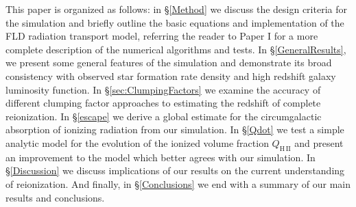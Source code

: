 This paper is organized as follows: in \S\ref{Method} we discuss the design criteria 
for the simulation and briefly outline the basic equations and implementation of the FLD radiation transport model, referring the
reader to Paper I for a more complete description of the numerical algorithms and tests.  
In \S\ref{GeneralResults},  we present some general features of the simulation and demonstrate its broad consistency with observed star formation rate density and high redshift 
galaxy luminosity function. 
In \S\ref{sec:ClumpingFactors} we examine the accuracy of different clumping factor approaches to estimating the redshift of complete reionization.
In \S\ref{escape} we derive a global estimate for the circumgalactic absorption of ionizing radiation from our simulation. 
In \S\ref{Qdot} we test a simple analytic model for the evolution of the ionized volume fraction $Q_\mathrm{H\,II}$ and present an improvement to the model which better agrees with our simulation. 
In \S\ref{Discussion} we
discuss implications of our results on the current understanding of
reionization.  And finally, in \S\ref{Conclusions} we end with a
summary of our main results and conclusions.


